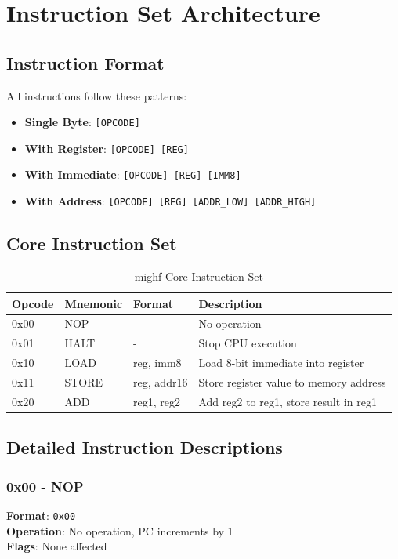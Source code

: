 \documentclass[a4paper,12pt]{article}
\begin{document}
\section{Instruction Set Architecture}

\subsection{Instruction Format}
All instructions follow these patterns:
\begin{itemize}
    \item \textbf{Single Byte}: \texttt{[OPCODE]}
    \item \textbf{With Register}: \texttt{[OPCODE] [REG]}
    \item \textbf{With Immediate}: \texttt{[OPCODE] [REG] [IMM8]}
    \item \textbf{With Address}: \texttt{[OPCODE] [REG] [ADDR\_LOW] [ADDR\_HIGH]}
\end{itemize}

\subsection{Core Instruction Set}

\begin{table}[h]
\centering
\begin{tabular}{|l|l|l|p{6cm}|}
\hline
\textbf{Opcode} & \textbf{Mnemonic} & \textbf{Format} & \textbf{Description} \\
\hline
0x00 & NOP & - & No operation \\
\hline
0x01 & HALT & - & Stop CPU execution \\
\hline
0x10 & LOAD & reg, imm8 & Load 8-bit immediate into register \\
\hline
0x11 & STORE & reg, addr16 & Store register value to memory address \\
\hline
0x20 & ADD & reg1, reg2 & Add reg2 to reg1, store result in reg1 \\
\hline
\end{tabular}
\caption{mighf Core Instruction Set}
\end{table}

\subsection{Detailed Instruction Descriptions}

\subsubsection{0x00 - NOP}
\textbf{Format}: \texttt{0x00}\\
\textbf{Operation}: No operation, PC increments by 1\\
\textbf{Flags}: None affected
\end{document}
